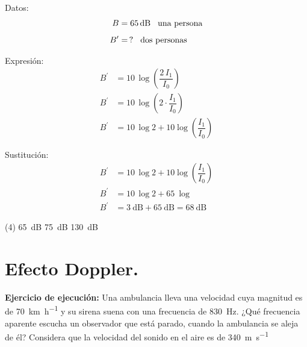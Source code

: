 \documentclass[12pt, letter]{exam}
\begin{document}
\begin{questions}
    \begin{minipage}[t]{0.35\linewidth}
    Datos: 
    \begin{align*}
    B &= \SI{65}{\dB} \hspace{0.3cm} \text{una persona} \\[0.5em]
    B^{\prime} &= \, ? \hspace{0.3cm} \text{dos personas}
    \end{align*}
    \end{minipage}
    \hspace{1cm}
    \begin{minipage}[t]{0.4\linewidth}
    Expresión:
    \begin{align*}
    B^{\prime} &= 10 \, \log \left( \dfrac{2 \, I_{1}}{I_{0}} \right) \\[0.4em]
    B^{\prime} &= 10 \, \log \left( 2 \cdot \dfrac{I_{1}}{I_{0}} \right) \\[0.4em]
    B^{\prime} &= 10 \, \log 2 + 10 \log \left( \dfrac{I_{1}}{I_{0}} \right)
    \end{align*}
    \end{minipage}

    Sustitución:
    \begin{align*}
    B^{\prime} &= 10 \, \log 2 + 10 \log \left( \dfrac{I_{1}}{I_{0}} \right) \\[0.4em]
    B^{\prime} &= 10 \, \log 2 + \SI{65}{\log} \\[0.4em]
    B^{\prime} &= \SI{3}{\dB} + \SI{65}{\dB} = \SI{68}{\dB}
    \end{align*}
    \begin{tasks}(4)
        \task \SI{65}{\dB}
        \task {}
        \task \SI{75}{\dB}
        \task \SI{130}{\dB}
    \end{tasks}

    \setcounter{section}{3}

    \section{Efecto Doppler.}

    \setcounter{question}{10} \question \textbf{Ejercicio de ejecución: } Una ambulancia lleva una velocidad cuya magnitud es de \SI{70}{\kilo\meter\per\hour} y su sirena suena con una frecuencia de \SI{830}{\hertz}. ¿Qué frecuencia aparente escucha un observador que está parado, cuando la ambulancia se aleja de él? Considera que la velocidad del sonido en el aire es de \SI{340}{\meter\per\second}


\end{questions}
\end{document}
